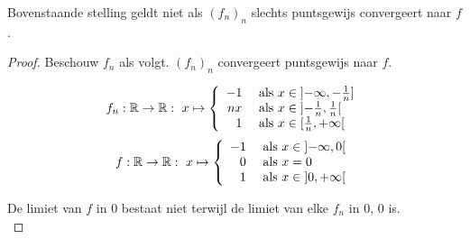 \documentclass[main.tex]{subfiles}
\begin{document}
\begin{tvb}
  Bovenstaande stelling geldt niet als $(f_{n})_{n}$ slechts puntsgewijs convergeert naar $f$.

  \begin{proof}
    Beschouw $f_{n}$ als volgt. $(f_{n})_{n}$ convergeert puntsgewijs naar $f$.\needed
    
    \noindent
    \begin{minipage}{.45\textwidth}
      \begin{figure}[H]
        \centering
      \end{figure}
    \end{minipage}
    \begin{minipage}{.45\textwidth}
      \[
      f_{n}: \mathbb{R} \rightarrow \mathbb{R}:\ x \mapsto
      \left\{
        \begin{array}{rl}
          -1 & \text{ als } x \in \interval[open left ]{-\infty}{-\frac{1}{n}}\\
          nx & \text{ als } x \in \interval[open      ]{-\frac{1}{n}}{\frac{1}{n}}\\
          1  & \text{ als } x \in \interval[open right]{\frac{1}{n}}{+\infty}\\
        \end{array}
      \right.
      \]
      \[
      f: \mathbb{R} \rightarrow \mathbb{R}:\ x \mapsto
      \left\{
        \begin{array}{rl}
          -1 & \text{ als } x \in \interval[open]{-\infty}{0}\\
          0  & \text{ als } x = 0\\
          1  & \text{ als } x \in \interval[open]{0}{+\infty}\\
        \end{array}
      \right.
      \]
    \end{minipage}
    De limiet van $f$ in $0$ bestaat niet terwijl de limiet van elke $f_{n}$ in $0$, $0$ is.\\


\end{proof}
\end{tvb}
\end{document}
